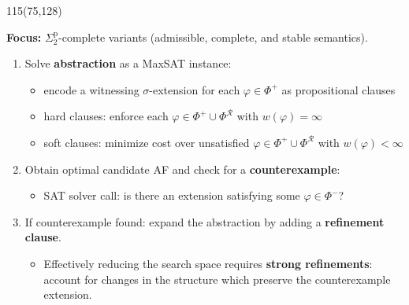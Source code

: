 \documentclass[a4paper]{article} %
\begin{document}
\begin{textblock}{115}(75,128)

\textbf{Focus:} $\Sigma_2^{\text{p}}$-complete variants (admissible, complete, and stable semantics).

\begin{enumerate}
    \item Solve \textbf{abstraction} as a MaxSAT instance:
    \begin{itemize}
        \item encode a witnessing $\sigma$-extension for each $\varphi \in \Phi^+$ as propositional clauses
        \item hard clauses: enforce each $\varphi \in \Phi^+ \cup \Phi^{\mathcal{R}}$ with $w(\varphi) = \infty$
        \item soft clauses: minimize cost over unsatisfied $\varphi \in \Phi^+ \cup \Phi^{\mathcal{R}}$ with $w(\varphi) < \infty$
    \end{itemize}
    \item Obtain optimal candidate AF and check for a \textbf{counterexample}:
    \begin{itemize}
        \item SAT solver call: is there an extension satisfying some $\varphi \in \Phi^-$?
    \end{itemize}
    \item If counterexample found: expand the abstraction by adding a \textbf{refinement clause}.
    \begin{itemize}
        \item Effectively reducing the search space requires \textbf{strong refinements}: account for changes in the structure which preserve the counterexample extension.
    \end{itemize}
\end{enumerate}

\end{textblock}
\end{document}
